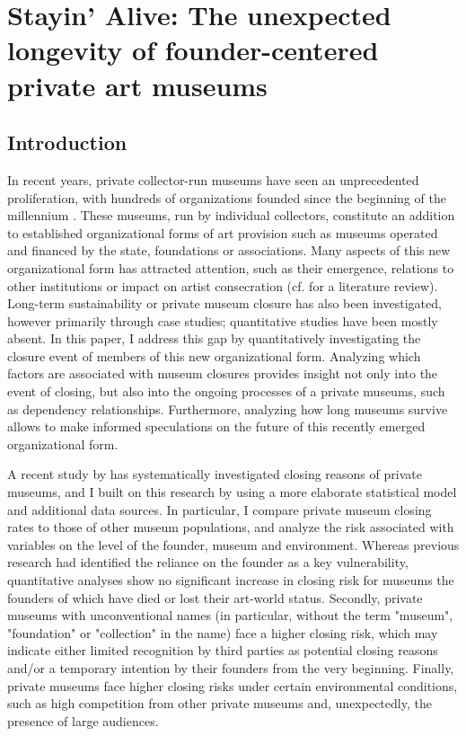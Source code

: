 \documentclass[12pt]{article}
\author{Johannes }
\date{\today}
\title{}
\begin{document}
\section*{Stayin' Alive: The unexpected longevity of founder-centered private art museums}

\subsection*{Introduction}


In recent years, private collector-run museums have seen an unprecedented proliferation, with hundreds of organizations founded since the beginning of the millennium \parencite{Velthuis_etal_2023_boom,LarrysList_2015_report}.
These museums, run by individual collectors, constitute an addition to established organizational forms of art provision such as museums operated and financed by the state, foundations or associations.
Many aspects of this new organizational form has attracted attention, such as their emergence, relations to other institutions or impact on artist consecration (cf. \cite{Kolbe_etal_2022_privatemuseum} for a literature review).
Long-term sustainability or private museum closure has also been investigated, however primarily through case studies; quantitative studies have been mostly absent.
In this paper, I address this gap by quantitatively investigating the closure event of members of this new organizational form.
Analyzing which factors are associated with museum closures provides insight not only into the event of closing, but also into the ongoing processes of a private museums, such as dependency relationships.
Furthermore, analyzing how long museums survive allows to make informed speculations on the future of this recently emerged organizational form. 


A recent study by \textcite{Velthuis_Gera_2024_fragility} has systematically investigated closing reasons of private museums, and I built on this research by using a more elaborate statistical model and additional data sources.
In particular, I compare private museum closing rates to those of other museum populations, and analyze the risk associated with variables on the level of the founder, museum and environment. 
Whereas previous research had identified the reliance on the founder as a key vulnerability, quantitative analyses show no significant increase in closing risk for museums the founders of which have died or lost their art-world status.
Secondly, private museums with unconventional names (in particular, without the term "museum", "foundation" or "collection" in the name) face a higher closing risk, which may indicate either limited recognition by third parties as potential closing reasons and/or a temporary intention by their founders from the very beginning.
Finally, private museums face higher closing risks under certain environmental conditions, such as high competition from other private museums and, unexpectedly, the presence of large audiences.
\end{document}
